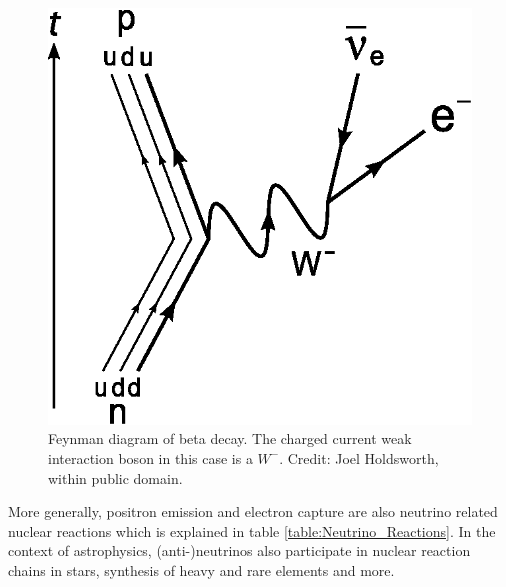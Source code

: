 \documentclass[%
 aip,
 jmp,%
 amsmath,amssymb,
 reprint,%
]{revtex4-1}
\begin{document}
\begin{figure}[h]
\centering
\includegraphics{assets/Beta_Negative_Decay.eps}
\caption{Feynman diagram of beta decay. The charged current weak interaction boson in this case is a $W^-$. Credit: Joel Holdsworth, within public domain.}
\label{fig:Beta_Negative_Decay}
\end{figure}

More generally, positron emission and electron capture are also neutrino related nuclear reactions which is explained in table \ref{table:Neutrino_Reactions}. In the context of astrophysics, (anti-)neutrinos also participate in nuclear reaction chains in stars, synthesis of heavy and rare elements and more.
\end{document}
